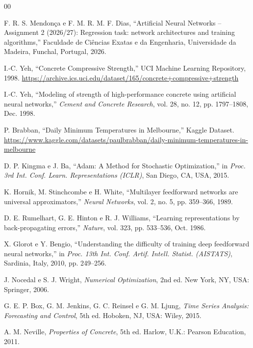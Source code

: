 \documentclass[conference]{IEEEtran}
\begin{document}
\begin{thebibliography}{00}

 F. R. S. Mendonça e F. M. R. M. F. Dias, ``Artificial Neural Networks -- Assignment 2 (2026/27): Regression task: network architectures and training algorithms,'' Faculdade de Ciências Exatas e da Engenharia, Universidade da Madeira, Funchal, Portugal, 2026.

 I.-C. Yeh, ``Concrete Compressive Strength,'' UCI Machine Learning Repository, 1998. \url{https://archive.ics.uci.edu/dataset/165/concrete+compressive+strength}

 I.-C. Yeh, ``Modeling of strength of high-performance concrete using artificial neural networks,'' \textit{Cement and Concrete Research}, vol. 28, no. 12, pp. 1797--1808, Dec. 1998.

 P. Brabban, ``Daily Minimum Temperatures in Melbourne,'' Kaggle Dataset. \url{https://www.kaggle.com/datasets/paulbrabban/daily-minimum-temperatures-in-melbourne}

 D. P. Kingma e J. Ba, ``Adam: A Method for Stochastic Optimization,'' in \textit{Proc. 3rd Int. Conf. Learn. Representations (ICLR)}, San Diego, CA, USA, 2015.

 K. Hornik, M. Stinchcombe e H. White, ``Multilayer feedforward networks are universal approximators,'' \textit{Neural Networks}, vol. 2, no. 5, pp. 359--366, 1989.

 D. E. Rumelhart, G. E. Hinton e R. J. Williams, ``Learning representations by back-propagating errors,'' \textit{Nature}, vol. 323, pp. 533--536, Oct. 1986.

 X. Glorot e Y. Bengio, ``Understanding the difficulty of training deep feedforward neural networks,'' in \textit{Proc. 13th Int. Conf. Artif. Intell. Statist. (AISTATS)}, Sardinia, Italy, 2010, pp. 249--256.

 J. Nocedal e S. J. Wright, \textit{Numerical Optimization}, 2nd ed. New York, NY, USA: Springer, 2006.

 G. E. P. Box, G. M. Jenkins, G. C. Reinsel e G. M. Ljung, \textit{Time Series Analysis: Forecasting and Control}, 5th ed. Hoboken, NJ, USA: Wiley, 2015.

 A. M. Neville, \textit{Properties of Concrete}, 5th ed. Harlow, U.K.: Pearson Education, 2011.

\end{thebibliography}
\end{document}
